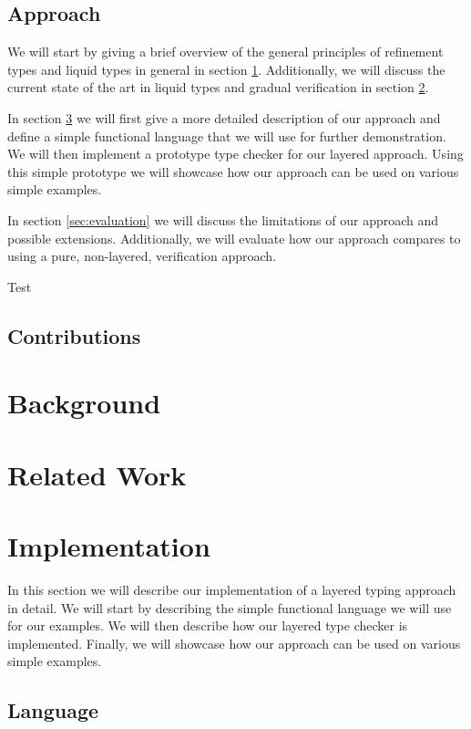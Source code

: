 \documentclass[acmsmall, review, screen]{acmart}
\begin{document}
\subsection{Approach}
We will start by giving a brief overview of the general principles of refinement types and liquid types in general in section \ref{sec:background}. Additionally, we will discuss the current state of the art in liquid types and gradual verification in section \ref{sec:related}. 

In section \ref{sec:implementation} we will first give a more detailed description of our approach and define a simple functional language that we will use for further demonstration. We will then implement a prototype type checker for our layered approach. Using this simple prototype we will showcase how our approach can be used on various simple examples.

In section \ref{sec:evaluation} we will discuss the limitations of our approach and possible extensions. Additionally, we will evaluate how our approach compares to using a pure, non-layered, verification approach.

Test

\subsection{Contributions}
\section{Background}
\label{sec:background}
\section{Related Work}
\label{sec:related}
\section{Implementation}
\label{sec:implementation}

In this section we will describe our implementation of a layered typing approach in detail. We will start by describing the simple functional language we will use for our examples. We will then describe how our layered type checker is implemented. Finally, we will showcase how our approach can be used on various simple examples.

\subsection{Language}
\label{ssec:language}
\end{document}
